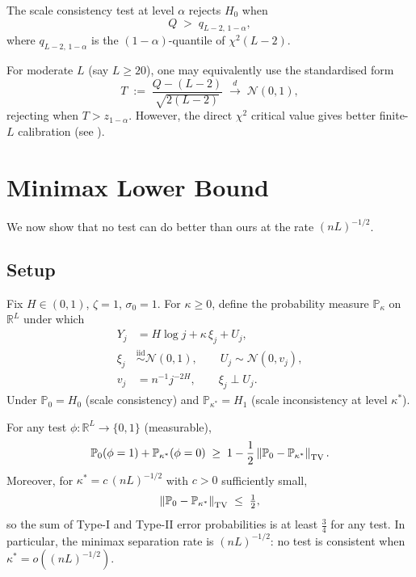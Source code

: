 \documentclass[10pt,a4paper,twocolumn]{article}
\newcommand{\R}{\mathbb{R}}
\newcommand{\Prob}{\mathbb{P}}
\newcommand{\iid}{\overset{\text{iid}}{\sim}}
\newcommand{\dto}{\xrightarrow{d}}
\newcommand{\calN}{\mathcal{N}}
\begin{document}
The scale consistency test at level $\alpha$ rejects $H_0$ when
\begin{equation}
    Q \;>\; q_{L-2,\,1-\alpha},
    \label{eq:test-rule}
\end{equation}
where $q_{L-2,\,1-\alpha}$ is the $(1-\alpha)$-quantile of $\chi^2(L-2)$.

For moderate $L$ (say $L \geq 20$), one may equivalently use the
standardised form
\[
    T \;:=\; \frac{Q - (L-2)}{\sqrt{2(L-2)}} \;\dto\; \calN(0,1),
\]
rejecting when $T > z_{1-\alpha}$.  However, the direct $\chi^2$ critical
value gives better finite-$L$ calibration (see ).

\section{Minimax Lower Bound}
\label{sec:lower}

We now show that no test can do better than ours at the rate $(nL)^{-1/2}$.

\subsection{Setup}

Fix $H \in (0,1)$, $\zeta = 1$, $\sigma_0 = 1$.  For $\kappa \geq 0$,
define the probability measure $\Prob_\kappa$ on $\R^L$ under which
\begin{align*}
    Y_j &= H\log j + \kappa\,\xi_j + U_j,\\
    \xi_j &\iid \calN(0,1), \qquad U_j \sim \calN(0, v_j),\\
    v_j &= n^{-1} j^{-2H}, \qquad \xi_j \perp U_j.
\end{align*}
Under $\Prob_0 = H_0$ (scale consistency) and $\Prob_{\kappa^*} = H_1$
(scale inconsistency at level $\kappa^*$).

\begin{theorem}
\label{thm:lecam-lower}
For any test $\phi: \R^L \to \{0,1\}$ (measurable),
\[
    \Prob_0(\phi = 1) + \Prob_{\kappa^*}(\phi = 0)
    \;\geq\;
    1 - \frac{1}{2}\norm{\Prob_0 - \Prob_{\kappa^*}}_{\mathrm{TV}}.
\]
Moreover, for $\kappa^* = c\,(nL)^{-1/2}$ with $c > 0$ sufficiently small,
\[
    \norm{\Prob_0 - \Prob_{\kappa^*}}_{\mathrm{TV}} \;\leq\; \tfrac{1}{2},
\]
so the sum of Type-I and Type-II error probabilities is at least $\frac{3}{4}$
for any test.  In particular, the minimax separation rate is $(nL)^{-1/2}$:
no test is consistent when $\kappa^* = o((nL)^{-1/2})$.
\end{theorem}
\end{document}
